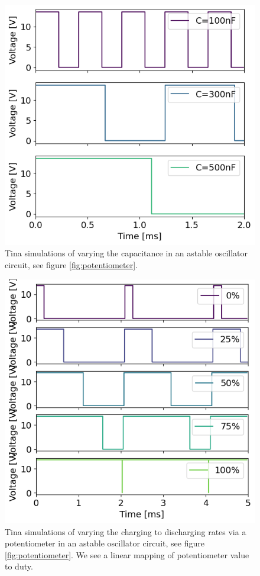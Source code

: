 \documentclass[%
 reprint,
 amsmath,amssymb,
 aps,
]{revtex4-2}
\begin{document}
        \begin{figure}
        \includegraphics[width=0.9\columnwidth]{Images/potentiometerFrequency.png}
        \caption{\label{fig:potentiometerFrequency}Tina simulations of varying the capacitance in an astable oscillator circuit, see figure \ref{fig:potentiometer}.}
        \end{figure}

        \begin{figure}
        \includegraphics[width=0.9\columnwidth]{Images/potentiometerDuty.png}
        \caption{\label{fig:potentiometerDuty}Tina simulations of varying the charging to discharging rates via a potentiometer in an astable oscillator circuit, see figure \ref{fig:potentiometer}. We see a linear mapping of potentiometer value to duty.}
        \end{figure}
\end{document}
